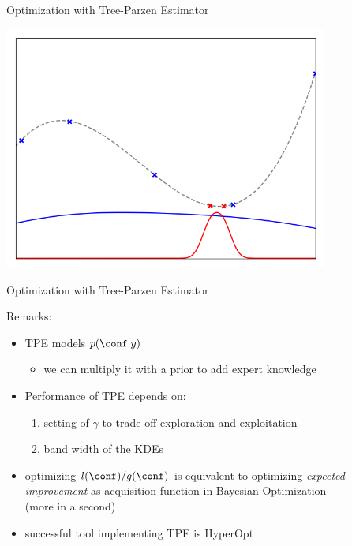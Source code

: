 \begin{frame}[c,fragile]{Optimization with Tree-Parzen Estimator }

\centering
\includegraphics[width=0.8\textwidth]{images/tpeiter_3_pdfs.png}


\end{frame}
\begin{frame}[c,fragile]{Optimization with Tree-Parzen Estimator }


Remarks:

\begin{itemize}
	\item TPE models $p(\conf | y)$
	\begin{itemize}
		\item we can multiply it with a prior to add expert knowledge
	\end{itemize}
	\smallskip
	\pause
	\item Performance of TPE depends on:
	\begin{enumerate}
		\item setting of $\gamma$ to trade-off exploration and exploitation
		\item band width of the KDEs 
	\end{enumerate}
	\pause
	\smallskip
	\item optimizing $l(\conf)/g(\conf)$ is equivalent to optimizing \emph{expected improvement} as acquisition function in Bayesian Optimization\\ (more in a second)
	\pause
	\smallskip
	\item successful tool implementing TPE is HyperOpt
\end{itemize}

\end{frame}
